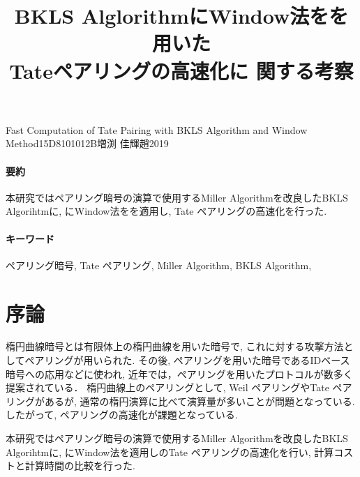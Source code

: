 \documentclass[twocolumn]{jsarticle} %
\begin{document}
\title{BKLS AlglorithmにWindow法をを用いた \\ Tateペアリングの高速化に
関する考察}{Fast Computation of Tate Pairing with BKLS Algorithm and Window Method}{15D8101012B}{増渕 佳輝}{趙}{2019}
\vspace{-5cm}
\paragraph{要約}
本研究ではペアリング暗号の演算で使用するMiller Algorithmを改良したBKLS Algorihtmに, にWindow法をを適用し, Tate ペアリングの高速化を行った.
\vspace{-2mm}
\paragraph{キーワード}
ペアリング暗号, Tate ペアリング, Miller Algorithm, BKLS Algorithm,
\vspace{-5mm}
\section{序論}
楕円曲線暗号とは有限体上の楕円曲線を用いた暗号で, これに対する攻撃方法としてペアリングが用いられた. その後, ペアリングを用いた暗号であるIDベース暗号への応用などに使われ,
近年では，ペアリングを用いたプロトコルが数多く提案されている．
楕円曲線上のペアリングとして,
Weil ペアリングやTate ペアリングがあるが, 通常の楕円演算に比べて演算量が多いことが問題となっている.
したがって, ペアリングの高速化が課題となっている.
\par
本研究ではペアリング暗号の演算で使用するMiller Algorithmを改良したBKLS Algorihtmに, にWindow法を適用しのTate ペアリングの高速化を行い,  計算コストと計算時間の比較を行った.
\end{document}
